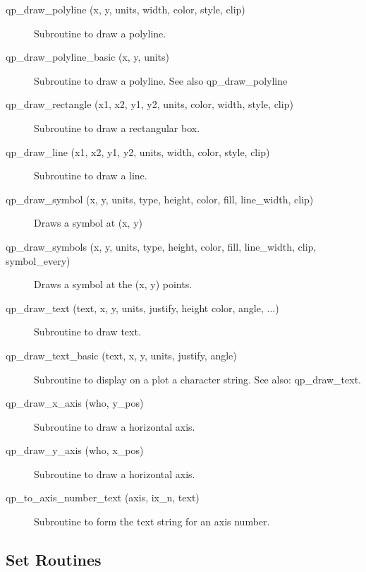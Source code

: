 \begin{description}
\item[qp\_draw\_polyline (x, y, units, width, color, style, clip)] \Newline 
     Subroutine to draw a polyline.

\item[qp\_draw\_polyline\_basic (x, y, units) ] \Newline 
     Subroutine to draw a polyline. See also qp\_draw\_polyline

\item[qp\_draw\_rectangle (x1, x2, y1, y2, units, color, width,
                                             style, clip) ] \Newline 
     Subroutine to draw a rectangular box.

\item[qp\_draw\_line (x1, x2, y1, y2, units, width, color, style, clip)] \Newline 
     Subroutine to draw a line.

\item[qp\_draw\_symbol (x, y, units, type, height, color, 
                                fill, line\_width, clip) ] \Newline 
     Draws a symbol at (x, y) 

\item[qp\_draw\_symbols (x, y, units, type, height, color,
            fill, line\_width, clip, symbol\_every) ] \Newline 
     Draws a symbol at the (x, y) points. 

\item[qp\_draw\_text (text, x, y, units, justify, height
        color, angle, ...) ] \Newline 
     Subroutine to draw text.

\item[qp\_draw\_text\_basic (text, x, y, units, justify, angle)] \Newline 
     Subroutine to display on a plot a character string.
     See also: qp\_draw\_text.

\item[qp\_draw\_x\_axis (who, y\_pos)] \Newline 
     Subroutine to draw a horizontal axis.

\item[qp\_draw\_y\_axis (who, x\_pos)] \Newline 
     Subroutine to draw a horizontal axis.

\item[qp\_to\_axis\_number\_text (axis, ix\_n, text)] \Newline 
     Subroutine to form the text string for an axis number.

\end{description}

\subsection{Set Routines}

